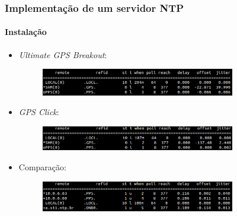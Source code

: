 \documentclass{beamer}
\begin{document}
\begin{frame}
\frametitle{Implementação de um servidor NTP}
\framesubtitle{Instalação}


\begin{itemize}
  \item \textit{Ultimate GPS Breakout}:
  \begin{figure}[h]
    \centering
    \includegraphics[width=0.80\textwidth]{image/adafruit_GPS}
    \label{img:adafruit} 
  \end{figure} 
  \item \textit{GPS Click}:
  \begin{figure}[h]
    \centering
    \includegraphics[width=0.80\textwidth]{image/mikroe}
    \label{img:mikroe} 
  \end{figure} 
  \item Comparação:
  \begin{figure}[h!]
    \centering
    \includegraphics[width=0.80\textwidth]{image/cliente-ntp}
    \label{img:cliente_ntp} 
\end{figure} 
\end{itemize}

\end{frame}

 
\end{document}

